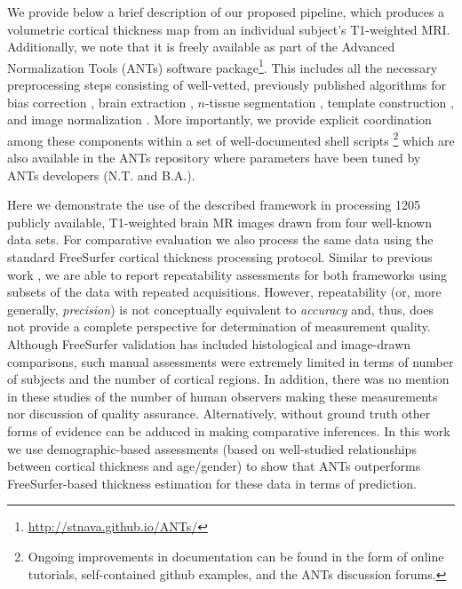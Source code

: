 We provide below a brief description of our proposed pipeline, which produces a volumetric
cortical thickness map from an individual subject's T1-weighted MRI.
Additionally, we note that it is freely available as part of the Advanced Normalization Tools
(ANTs) software package\footnote{\href{http://stnava.github.io/ANTs/}{http://stnava.github.io/ANTs/}}.  This includes all the necessary preprocessing steps consisting
of well-vetted, previously published algorithms for bias correction \citep{tustison2010},
brain extraction \citep{avants2010a}, $n$-tissue segmentation \citep{avants2011a},
template construction \citep{avants2010}, and image normalization \citep{avants2011}.
More importantly, we provide explicit coordination among
these components within a set of well-documented shell scripts%
\footnote{
Ongoing improvements in documentation can be found in the form of online tutorials, 
self-contained github examples, and the ANTs discussion forums.
}
which are also available in the ANTs repository where parameters have been tuned
by ANTs developers (N.T. and B.A.).  

Here we demonstrate the use of the described framework in processing
1205 publicly available, T1-weighted brain MR images drawn from four
well-known data sets.  For comparative evaluation we also process the
same data using the standard FreeSurfer cortical thickness processing
protocol.  Similar to previous work \citep[e.g.,][]{clarkson2011}, we
are able to report repeatability assessments for both frameworks using
subsets of the data with repeated acquisitions.
However, repeatability (or, more generally, {\it precision}) is not
conceptually equivalent to {\it accuracy} and, thus, does not provide
a complete perspective for determination of measurement quality.
Although FreeSurfer validation has included histological
\citep{rosas2002} and image-drawn \citep{kuperberg2003} comparisons,
such manual assessments were extremely limited in terms of number of
subjects and the number of cortical regions.  In addition, there was
no mention in these studies of the number of human observers making
these measurements nor discussion of quality assurance.
Alternatively, without ground truth other forms of evidence can be
adduced \citep[e.g.,][]{bouix2007} in making comparative inferences.
In this work we use demographic-based assessments 
(based on well-studied relationships between cortical thickness
and age/gender) to show that ANTs outperforms FreeSurfer-based thickness 
estimation for these data in terms of prediction.

